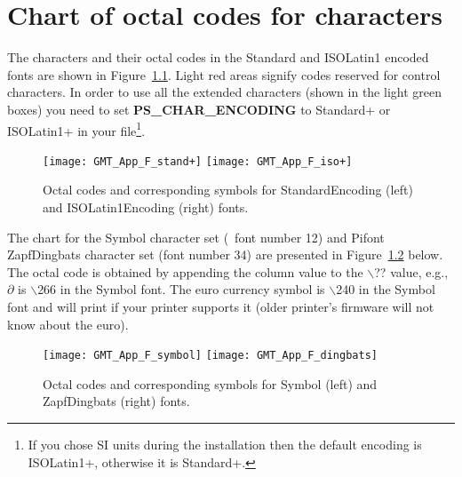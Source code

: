 %
%
\chapter{Chart of octal codes for characters}
\label{app:F}

The characters and their octal codes in the Standard and ISOLatin1 encoded fonts
are shown in Figure~\ref{fig:GMT_App_F_text}.  Light red areas signify codes reserved for
control characters.  In order to use all the extended characters (shown in the light green boxes) you need to
set \textbf{PS\_CHAR\_ENCODING} to Standard+ or ISOLatin1+ in your  file\footnote{If you chose
SI units during the installation then the default encoding is ISOLatin1+, otherwise it is Standard+.}.

\begin{figure}[h]
   \texttt{[image: GMT\_App\_F\_stand+]}\hfill
   \texttt{[image: GMT\_App\_F\_iso+]}
   \caption{Octal codes and corresponding symbols for StandardEncoding (left)
   and ISOLatin1Encoding (right) fonts.}
   \label{fig:GMT_App_F_text}
\end{figure}

\clearpage


The chart for the Symbol character set (\GMT\ font number 12) and Pifont ZapfDingbats character set
(font number 34)
are presented in Figure~\ref{fig:GMT_App_F_symbol} below. The octal code is obtained by appending the
column value to the $\backslash$?? value, e.g., $\partial$ is
$\backslash$266 in the Symbol font.  The euro currency symbol is $\backslash$240 in the Symbol font and will
print if your printer supports it (older printer's firmware will not know about the euro).

\begin{figure}[h]
   \texttt{[image: GMT\_App\_F\_symbol]}\hfill
   \texttt{[image: GMT\_App\_F\_dingbats]}
   \caption{Octal codes and corresponding symbols for Symbol (left)
   and ZapfDingbats (right) fonts.}
   \label{fig:GMT_App_F_symbol}
\end{figure}
